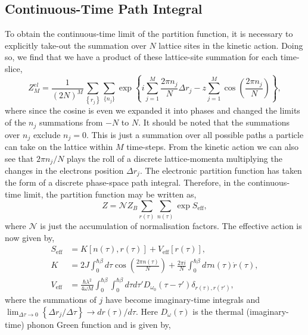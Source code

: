 \subsection{Continuous-Time Path Integral}
\label{subsec:3-2-2}

To obtain the continuous-time limit of the partition function, it is necessary to explicitly take-out the summation over $N$ lattice sites in the kinetic action. Doing so, we find that we have a product of these lattice-site summation for each time-slice,
\begin{equation}
    Z^{el}_M = \frac{1}{(2N)^M} \sum_{\left\{r_j\right\}} \sum_{\{n_j\}} \exp\left\{i \sum_{j=1}^M \frac{2 \pi n_j}{N} \Delta r_j - z \sum_{j=1}^M \cos(\frac{2 \pi n_j}{N})\right\} ,
\end{equation}
where since the cosine is even we expanded it into phases and changed the limits of the $n_j$ summations from $-N$ to $N$. It should be noted that the summations over $n_j$ exclude $n_j = 0$. This is just a summation over all possible paths a particle can take on the lattice within $M$ time-steps. From the kinetic action we can also see that $2\pi n_j / N$ plays the roll of a discrete lattice-momenta multiplying the changes in the electrons position $\Delta r_j$. The electronic partition function has taken the form of a discrete phase-space path integral. Therefore, in the continuous-time limit, the partition function may be written as,
\begin{equation}
    Z = \mathcal{N} Z_B \sum_{r(\tau)} \sum_{n(\tau)} \exp{S_{\text{eff}}} ,
\end{equation}
where $\mathcal{N}$ is just the accumulation of normalisation factors. The effective action is now given by,
\begin{equation}
    \begin{aligned}
        S_{\text{eff}} &= K[n(\tau), r(\tau)] + V_{\text{eff}}[r(\tau)] , \\
        K &= 2J \int_0^{\hbar\beta} d\tau \cos{\left(\frac{2\pi n(\tau)}{N}\right)} + \frac{2\pi i}{N} \int_0^{\hbar\beta} d\tau n(\tau) \Dot{r}(\tau) , \\
        V_{\text{eff}} &= \frac{\hbar \lambda^2}{4 \omega M} \int_0^{\hbar\beta} \int_0^{\hbar\beta} d\tau d\tau' D_{\omega_0}(\tau - \tau') \delta_{r(\tau), r(\tau')} ,
    \end{aligned}
\end{equation}
where the summations of $j$ have become imaginary-time integrals and $\lim_{\Delta\tau \to 0} \left\{\Delta r_j / \Delta \tau\right\} \rightarrow d r(\tau) / d\tau$. Here $D_{\omega}(\tau)$ is the thermal (imaginary-time) phonon Green function  and is given by,
